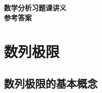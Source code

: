 \documentclass[UTF8,a4paper,10pt,twoside]{book}
\begin{document}
\setlength\abovedisplayskip{3pt}
\setlength\belowdisplayskip{3pt}
\begin{titlepage}

	\begin{center}
		\vfill
		{\Huge \bfseries 数学分析习题课讲义}\\[1.5cm]
		{\LARGE \bfseries 参考答案}\\[0.4cm]
		\vfill
	\end{center}

\end{titlepage}
\renewcommand{\proofname}{\bf 证明}

\setcounter{chapter}{1}
\chapter{数列极限}
\section{数列极限的基本概念}
\end{document}
